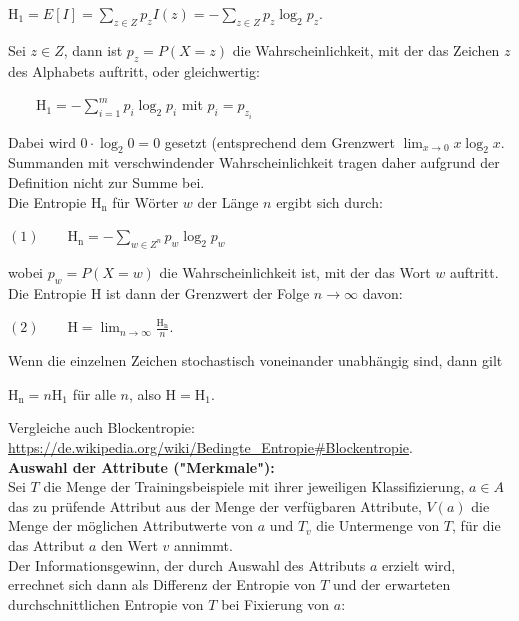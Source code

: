 \documentclass[12pt]{article}
\begin{document}
\begin{center}
$ \mathrm{H_1} = E[I]= \sum_{z\in Z} p_z I(z) = - \sum_{z\in Z} p_z \log_2 p_z $.\\
\end{center}
Sei $ z \in Z $, dann ist $ p_z = P(X=z) $ die Wahrscheinlichkeit, mit der das Zeichen $ z $ des Alphabets auftritt, oder gleichwertig:\\ 
\begin{center}
$ \qquad \mathrm{H_1} = - \sum_{i=1}^{m} p_i \log_2 p_i $ mit $ p_i = p_{z_i} $ 
\end{center}
Dabei wird $ 0\cdot\log_2 0=0 $ gesetzt (entsprechend dem Grenzwert $  \lim_{x \rightarrow 0} x \log_2 x $. Summanden mit verschwindender Wahrscheinlichkeit tragen daher aufgrund der Definition nicht zur Summe bei.\\[0.2cm]
Die Entropie $ \mathrm{H_n} $ für Wörter $ w $ der Länge $ n $ ergibt sich durch:
\begin{center}
$ (1) \qquad \mathrm{H_n} = -\sum_{w \in Z^n} p_w \log_2 p_w $
\end{center}
wobei $ p_w  = P(X=w)$ die Wahrscheinlichkeit ist, mit der das Wort $  w $ auftritt. \\[0.2cm]
Die Entropie $ \mathrm{H} $ ist dann der Grenzwert der Folge $ n\to \infty $ davon:
\begin{center}
$ (2)\qquad \mathrm{H} = \lim_{n\to \infty} \frac {\mathrm{H_n}}{n} $.
\end{center}
Wenn die einzelnen Zeichen stochastisch voneinander unabhängig sind, dann gilt
\begin{center}
 $ \mathrm{H_n} = n \mathrm{H_1} $ für alle $ n $, also $ \mathrm{H} = \mathrm{H_1} $. 
\end{center} 
%
Vergleiche auch Blockentropie: \url{https://de.wikipedia.org/wiki/Bedingte_Entropie#Blockentropie}.\\[0.4cm]
% 
\textbf{Auswahl der Attribute ("Merkmale"):}\\[0.3cm]
Sei $ T $ die Menge der Trainingsbeispiele mit ihrer jeweiligen Klassifizierung, $ a \in A $ das zu prüfende Attribut aus der Menge der verfügbaren Attribute, $ V(a) $ die Menge der möglichen Attributwerte von $ a $ und $ T_ v$ die Untermenge von $ T $, für die das Attribut $ a $ den Wert $ v $ annimmt. \\
Der Informationsgewinn, der durch Auswahl des Attributs $ a $ erzielt wird, errechnet sich dann als Differenz der Entropie von $ T $ und der erwarteten durchschnittlichen Entropie von $ T $ bei Fixierung von $ a $:\\
\end{document}
